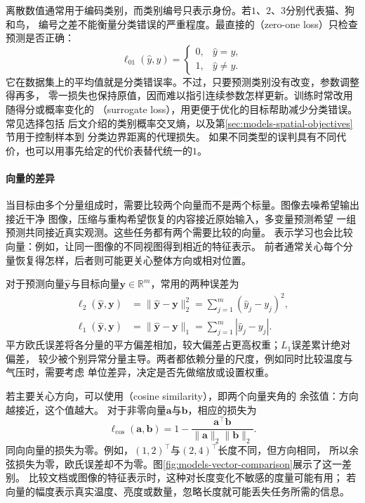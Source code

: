 离散数值通常用于编码类别，而类别编号只表示身份。若$1$、$2$、$3$分别代表猫、狗和鸟，
编号之差不能衡量分类错误的严重程度。最直接的（zero-one loss）只检查
预测是否正确：
\begin{equation}
  \ell_{01}(\hat{y},y)=
  \begin{cases}
    0, & \hat{y}=y,\\
    1, & \hat{y}\ne y.
  \end{cases}
  \label{eq:models-zero-one-loss}
\end{equation}
它在数据集上的平均值就是分类错误率。不过，只要预测类别没有改变，参数调整得再多，
零一损失也保持原值，因而难以指引连续参数怎样更新。训练时常改用随得分或概率变化的
（surrogate loss），用更便于优化的目标帮助减少分类错误。常见选择包括
后文介绍的类别概率交叉熵，以及第\ref{sec:models-spatial-objectives}节用于控制样本到
分类边界距离的代理损失。
如果不同类型的误判具有不同代价，也可以用事先给定的代价表替代统一的$1$。

\paragraph{向量的差异}
\label{sec:models-vector-objectives}

当目标由多个分量组成时，需要比较两个向量而不是两个标量。图像去噪希望输出接近干净
图像，压缩与重构希望恢复的内容接近原始输入，多变量预测希望
一组预测共同接近真实观测。这些任务都有两个需要比较的向量。
表示学习也会比较向量：例如，让同一图像的不同视图得到相近的特征表示。
前者通常关心每个分量恢复得怎样，后者则可能更关心整体方向或相对位置。

对于预测向量$\hat{\bm{y}}$与目标向量$\bm{y}\in\mathbb{R}^{m}$，常用的两种误差为
\begin{align}
  \ell_2(\hat{\bm{y}},\bm{y})
    &=\lVert\hat{\bm{y}}-\bm{y}\rVert_2^2
      =\sum_{j=1}^{m}(\hat{y}_j-y_j)^2,
    \label{eq:models-vector-loss}\\
  \ell_1(\hat{\bm{y}},\bm{y})
    &=\lVert\hat{\bm{y}}-\bm{y}\rVert_1
      =\sum_{j=1}^{m}|\hat{y}_j-y_j|.
    \label{eq:models-vector-l1}
\end{align}
平方欧氏误差将各分量的平方偏差相加，较大偏差占更高权重；$L_1$误差累计绝对偏差，
较少被个别异常分量主导。两者都依赖分量的尺度，例如同时比较温度与气压时，需要考虑
单位差异，决定是否先做缩放或设置权重。

若主要关心方向，可以使用（cosine similarity），即两个向量夹角的
余弦值：方向越接近，这个值越大。
对于非零向量$\bm{a}$与$\bm{b}$，相应的损失为
\begin{equation}
  \ell_{\mathrm{cos}}(\bm{a},\bm{b})
  =1-\frac{\bm{a}^{\top}\bm{b}}
          {\lVert\bm{a}\rVert_2\lVert\bm{b}\rVert_2}.
  \label{eq:models-cosine}
\end{equation}
同向向量的损失为零。例如，$(1,2)^{\top}$与$(2,4)^{\top}$长度不同，但方向相同，
所以余弦损失为零，欧氏误差却不为零。图\ref{fig:models-vector-comparison}展示了这一差别。
比较文档或图像的特征表示时，这种对长度变化不敏感的度量可能有用；
若向量的幅度表示真实温度、亮度或数量，忽略长度就可能丢失任务所需的信息。

